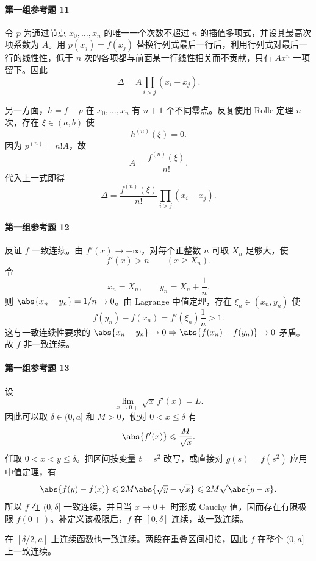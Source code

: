 \paragraph{第一组参考题 11}
\begin{xsolution}
令 $p$ 为通过节点 $x_0,\ldots,x_n$ 的唯一一个次数不超过 $n$ 的插值多项式，并设其最高次项系数为 $A$。用 $p(x_j)=f(x_j)$ 替换行列式最后一行后，利用行列式对最后一行的线性性，低于 $n$ 次的各项都与前面某一行线性相关而不贡献，只有 $Ax^n$ 一项留下。因此
\[
  \Delta=A\prod_{i>j}(x_i-x_j).
\]

另一方面，$h=f-p$ 在 $x_0,\ldots,x_n$ 有 $n+1$ 个不同零点。反复使用 Rolle 定理 $n$ 次，存在 $\xi\in(a,b)$ 使
\[
  h^{(n)}(\xi)=0.
\]
因为 $p^{(n)}=n!A$，故
\[
  A=\frac{f^{(n)}(\xi)}{n!}.
\]
代入上一式即得
\[
  \Delta=\frac{f^{(n)}(\xi)}{n!}
  \prod_{i>j}(x_i-x_j).
\]
\end{xsolution}

\paragraph{第一组参考题 12}
\begin{xsolution}
反证 $f$ 一致连续。由 $f'(x)\to+\infty$，对每个正整数 $n$ 可取 $X_n$ 足够大，使
\[
  f'(x)>n\qquad(x\geqslant X_n).
\]
令
\[
  x_n=X_n,
  \qquad
  y_n=X_n+\frac1n.
\]
则 $\abs{x_n-y_n}=1/n\to0$。由 Lagrange 中值定理，存在 $\xi_n\in(x_n,y_n)$ 使
\[
  f(y_n)-f(x_n)=f'(\xi_n)\frac1n>1.
\]
这与一致连续性要求的 $\abs{x_n-y_n}\to0\Rightarrow\abs{f(x_n)-f(y_n)}\to0$ 矛盾。故 $f$ 非一致连续。
\end{xsolution}

\paragraph{第一组参考题 13}
\begin{xsolution}
设
\[
  \lim_{x\to0+}\sqrt{x}\,f'(x)=L.
\]
因此可以取 $\delta\in(0,a]$ 和 $M>0$，使对 $0<x\leqslant\delta$ 有
\[
  \abs{f'(x)}\leqslant\frac{M}{\sqrt{x}}.
\]
任取 $0<x<y\leqslant\delta$。把区间按变量 $t=s^2$ 改写，或直接对 $g(s)=f(s^2)$ 应用中值定理，有
\[
  \abs{f(y)-f(x)}
  \leqslant2M\abs{\sqrt y-\sqrt x}
  \leqslant2M\sqrt{\abs{y-x}}.
\]
所以 $f$ 在 $(0,\delta]$ 一致连续，并且当 $x\to0+$ 时形成 Cauchy 值，因而存在有限极限 $f(0+)$。补定义该极限后，$f$ 在 $[0,\delta]$ 连续，故一致连续。

在 $[\delta/2,a]$ 上连续函数也一致连续。两段在重叠区间相接，因此 $f$ 在整个 $(0,a]$ 上一致连续。
\end{xsolution}

